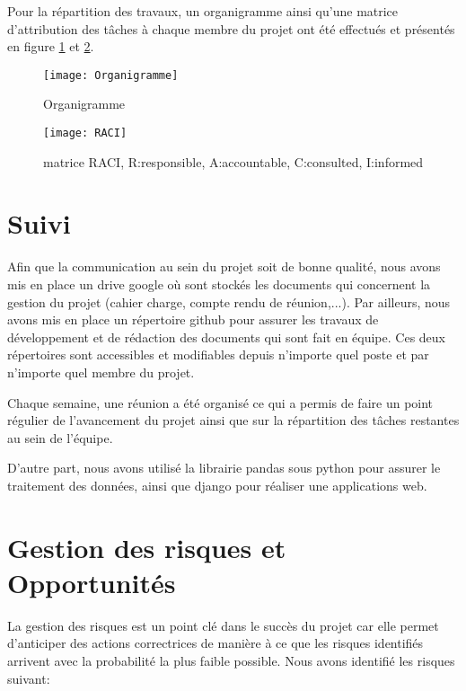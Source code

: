Pour la répartition des travaux, un organigramme ainsi qu'une matrice d'attribution des tâches à chaque membre du projet ont été effectués et présentés en figure \ref{fig:Organigramme} et \ref{fig:raci}.

\begin{figure}[!ht]
	\centering
	\texttt{[image: Organigramme]}
	\caption{Organigramme}
	\label{fig:Organigramme}
\end{figure}

\begin{figure}[!h]
	\centering
	\texttt{[image: RACI]}
	\caption{matrice RACI, R:responsible, A:accountable, C:consulted, I:informed}
	\label{fig:raci}
\end{figure}



\section*{Suivi}
Afin que la communication au sein du projet soit de bonne qualité, nous avons mis en place un drive google où sont stockés les documents qui concernent la gestion du projet (cahier charge, compte rendu de réunion,...). Par ailleurs, nous avons mis en place un répertoire github pour assurer les travaux de développement et de rédaction des documents qui sont fait en équipe. Ces deux répertoires sont accessibles et modifiables depuis n'importe quel poste et par n'importe quel membre du projet. 

Chaque semaine, une réunion a été organisé ce qui a permis de faire un point régulier de l'avancement du projet ainsi que sur la répartition des tâches restantes au sein de l'équipe. 

D'autre part, nous avons utilisé la librairie pandas sous python pour assurer le traitement des données, ainsi que django pour réaliser une  applications web. 



\section*{Gestion des risques et Opportunités}
La gestion des risques est un point clé dans le succès du projet car elle permet d'anticiper des actions correctrices de manière à ce que les risques identifiés arrivent avec la probabilité la plus faible possible. Nous avons identifié les risques suivant:

